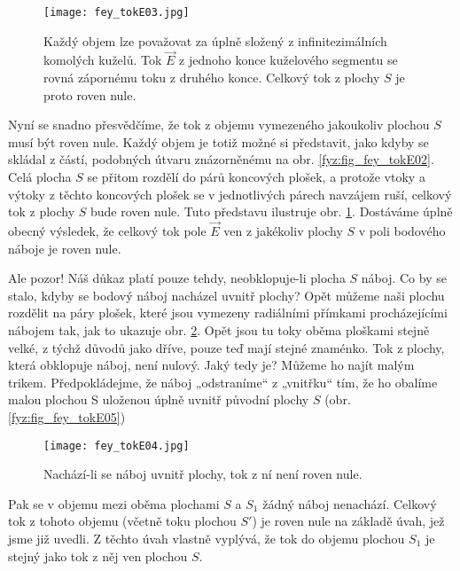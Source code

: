     \begin{figure}[ht!]
      \centering
      \texttt{[image: fey\_tokE03.jpg]}
      \caption{Každý objem lze považovat za úplně složený z infinitezimálních komolých kuželů. Tok 
               \(\vec{E}\) z jednoho konce kuželového segmentu se rovná zápornému toku z druhého 
               konce. Celkový tok z plochy \(S\) je proto roven nule.}
      \label{fyz:fig_fey_tokE03} 
    \end{figure}                         

    Nyní se snadno přesvědčíme, že tok z objemu vymezeného jakoukoliv plochou \(S\) musí být roven 
    nule. Každý objem je totiž možné si představit, jako kdyby se skládal z částí, podobných útvaru 
    znázorněnému na obr. \ref{fyz:fig_fey_tokE02}. Celá plocha \(S\) se přitom rozdělí do párů 
    koncových plošek, a protože vtoky a výtoky z těchto koncových plošek se v jednotlivých párech 
    navzájem ruší, celkový tok z plochy \(S\) bude roven nule. Tuto představu ilustruje obr. 
    \ref{fyz:fig_fey_tokE03}. Dostáváme úplně obecný výsledek, že celkový tok pole \(\vec{E}\) ven z 
    jakékoliv plochy \(S\) v poli bodového náboje je roven nule. 
                     
    Ale pozor! Náš důkaz platí pouze tehdy, neobklopuje-li plocha \(S\) náboj. Co by se stalo, kdyby 
    se bodový náboj nacházel uvnitř plochy? Opět můžeme naši plochu rozdělit na páry plošek, které 
    jsou vymezeny radiálními přímkami procházejícími nábojem tak, jak to ukazuje obr. 
    \ref{fyz:fig_fey_tokE04}. Opět jsou tu toky  oběma ploškami stejně velké, z týchž důvodů jako 
    dříve, pouze teď mají stejné znaménko. Tok z plochy, která obklopuje náboj, není nulový. Jaký 
    tedy je? Můžeme ho najít malým trikem. Předpokládejme, že náboj „odstraníme“ z „vnitřku“ tím, že 
    ho obalíme malou plochou S uloženou úplně uvnitř původní plochy \(S\) (obr. 
    \ref{fyz:fig_fey_tokE05})           

    \begin{figure}[ht!]
      \centering                  
      \texttt{[image: fey\_tokE04.jpg]}
      \caption{Nachází-li se náboj uvnitř plochy, tok z ní není roven nule.}
      \label{fyz:fig_fey_tokE04}  
    \end{figure}        
   
    Pak se v objemu mezi oběma plochami \(S\) a \(S_1\) žádný náboj nenachází. Celkový tok z tohoto 
    objemu (včetně toku plochou \(S'\)) je roven nule na základě úvah, jež jsme již uvedli. Z těchto 
    úvah vlastně vyplývá, že tok do objemu plochou \(S_1\) je stejný jako tok z něj ven plochou 
    \(S\).
        

